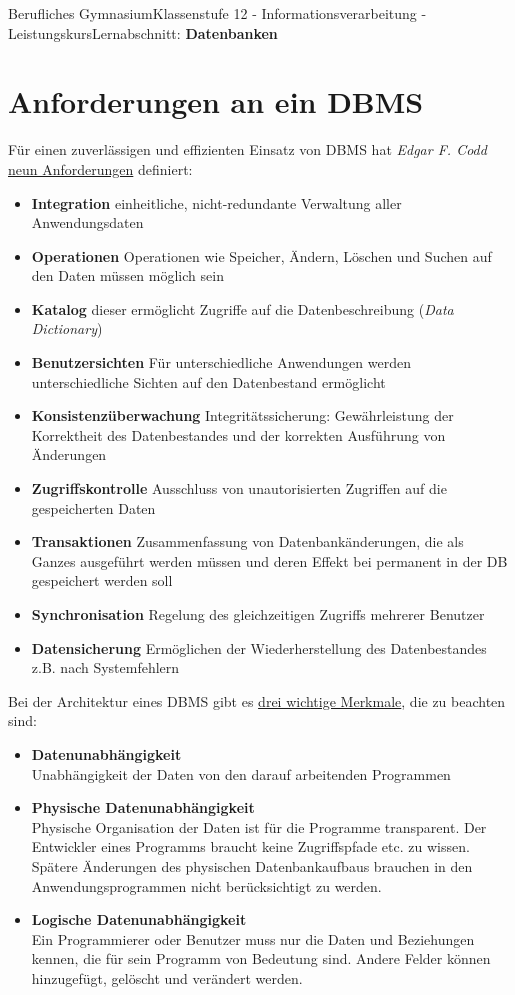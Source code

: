 \documentclass[11pt,oneside,openany,headings=optiontotoc,11pt,numbers=noenddot]{article}
\begin{document}
\begin{worksheet}{Berufliches Gymnasium}{Klassenstufe 12 - Informationsverarbeitung - Leistungskurs}{Lernabschnitt: \textbf{Datenbanken}}
		\section*{Anforderungen an ein DBMS}
		Für einen zuverlässigen und effizienten Einsatz von DBMS hat \textit{Edgar F. Codd} \underline{neun Anforderungen} definiert:
		\begin{itemize}[label=$\circ$]
			\item \textbf{Integration} einheitliche, nicht-redundante Verwaltung aller Anwendungsdaten
			\item \textbf{Operationen} Operationen wie Speicher, Ändern, Löschen und Suchen auf den Daten müssen möglich sein
			\item \textbf{Katalog} dieser ermöglicht Zugriffe auf die Datenbeschreibung (\textit{Data Dictionary})
			\item \textbf{Benutzersichten} Für unterschiedliche Anwendungen werden unterschiedliche Sichten auf den Datenbestand ermöglicht
			\item \textbf{Konsistenzüberwachung} Integritätssicherung: Gewährleistung der Korrektheit des Datenbestandes und der korrekten Ausführung von Änderungen
			\item \textbf{Zugriffskontrolle} Ausschluss von unautorisierten Zugriffen auf die gespeicherten Daten
			\item \textbf{Transaktionen} Zusammenfassung von Datenbankänderungen, die als Ganzes ausgeführt werden müssen und deren Effekt bei permanent in der DB gespeichert werden soll
			\item \textbf{Synchronisation} Regelung des gleichzeitigen Zugriffs mehrerer Benutzer
			\item \textbf{Datensicherung} Ermöglichen der Wiederherstellung des Datenbestandes z.B. nach Systemfehlern
		\end{itemize}
		Bei der Architektur eines DBMS gibt es \underline{drei wichtige Merkmale}, die zu beachten sind:
		\begin{itemize}[label=$\circ$]
			\item \textbf{Datenunabhängigkeit}\\
			Unabhängigkeit der Daten von den darauf arbeitenden Programmen
			\item \textbf{Physische Datenunabhängigkeit}\\
			Physische Organisation der Daten ist für die Programme transparent. Der Entwickler eines Programms braucht keine Zugriffspfade etc. zu wissen. Spätere Änderungen des physischen Datenbankaufbaus brauchen in den Anwendungsprogrammen nicht berücksichtigt zu werden.
			\item \textbf{Logische Datenunabhängigkeit}\\
			Ein Programmierer oder Benutzer muss nur die Daten und Beziehungen kennen, die für sein Programm von Bedeutung sind. Andere Felder können hinzugefügt, gelöscht und verändert werden.
		\end{itemize}
	\end{worksheet}
\end{document}
